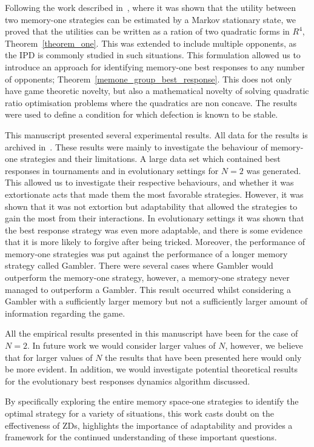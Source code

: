 \documentclass[10pt]{article}
\begin{document}
Following the work described in~\cite{Nowak1989}, where it was shown that the
utility between two memory-one strategies can be estimated by a Markov
stationary state, we proved that the utilities can be written as a ration of two
quadratic forms in $R^4$, Theorem~\ref{theorem_one}. This was extended to
include multiple opponents, as the IPD is commonly studied in such situations.
This formulation allowed us to introduce an approach for identifying memory-one
best responses to any number of opponents;
Theorem~\ref{memone_group_best_response}. This does not only have game theoretic
novelty, but also a mathematical novelty of solving quadratic ratio optimisation
problems where the quadratics are non concave. The results were used to
define a condition for which defection is known to be stable.

This manuscript presented several experimental results. All data for the results
is archived in~\cite{glynatsi2019}. These results were mainly to investigate the
behaviour of memory-one strategies and their limitations. A large data set which
contained best responses in tournaments and in evolutionary settings for $N=2$
was generated. This allowed us to investigate their respective behaviours, and
whether it was extortionate acts that made them the most favorable strategies.
However, it was shown that it was not extortion but adaptability that allowed
the strategies to gain the most from their interactions. In evolutionary settings
it was shown that the best response strategy was even more adaptable, and there
is some evidence that it is more likely to forgive after being tricked.
Moreover, the performance of
memory-one strategies was put against the performance of a longer memory
strategy called Gambler. There were several cases where Gambler would outperform
the memory-one strategy, however, a memory-one strategy never managed to
outperform a Gambler. This result occurred whilst considering a Gambler with a
sufficiently larger memory but not a sufficiently larger amount of information
regarding the game.

All the empirical results presented in this manuscript have been for the case of
$N=2$. In future work we would consider larger values of $N$, however, we
believe that for larger values of $N$ the results that have been presented here
would only be more evident. In addition, we would investigate potential
theoretical results for the evolutionary best responses dynamics algorithm
discussed.

By specifically exploring the entire memory space-one strategies to identify
the optimal strategy for a variety of situations, this work casts doubt
on the effectiveness of ZDs, highlights the importance of adaptability and provides
a framework for the continued understanding of these important questions.
\end{document}
